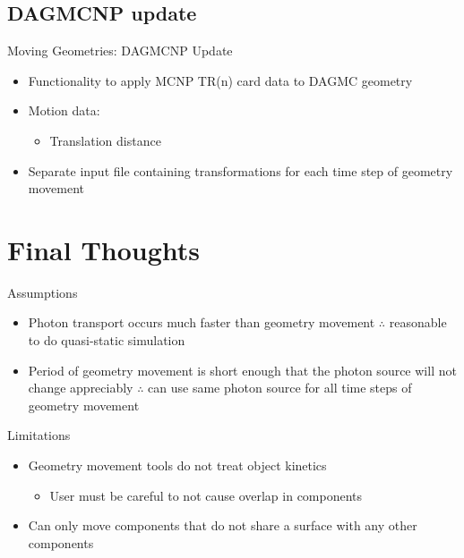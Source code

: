 \documentclass{beamer}
\begin{document}
\subsection{DAGMCNP update}
\begin{frame}{Moving Geometries: DAGMCNP Update}
	\begin{itemize}
		\item{Functionality to apply MCNP TR(n) card data to DAGMC
			geometry}
		\item{Motion data:}
			\begin{itemize}
				\item{Translation distance}
			\end{itemize}
		\item{Separate input file containing transformations for each
			time step of geometry movement}
	\end{itemize}
\end{frame}


\section{Final Thoughts}
\begin{frame}{Assumptions}
			\begin{itemize}
				\item{Photon transport occurs much faster than
					geometry movement $\therefore$
					reasonable to do quasi-static
					simulation}
				\item{Period of geometry movement is short
					enough that the photon source will not
					change appreciably $\therefore$ can use
					same photon source for all time steps
					of geometry movement}
			\end{itemize}
	\end{frame}
\begin{frame}{Limitations}
\begin{itemize}
\item{Geometry movement tools do not treat object kinetics}
   \begin{itemize}
   \item{User must be careful to not cause overlap in components}
   \end{itemize}
\item{Can only move components that do not share a surface with any other components}
\end{itemize}
\end{frame}
\end{document}
